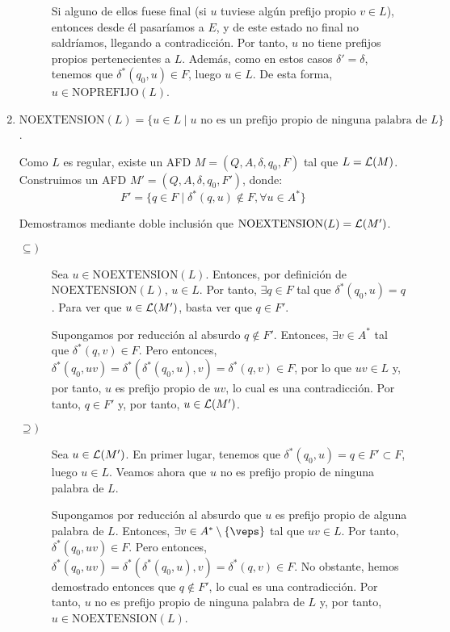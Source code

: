 \begin{ejercicio}
\begin{enumerate}
\begin{description}
            Si alguno de ellos fuese final (si $u$ tuviese algún prefijo propio $v\in L$), entonces desde él pasaríamos a $E$, y de este estado no final no saldríamos, llegando a contradicción. Por tanto, $u$ no tiene prefijos propios pertenecientes a $L$. Además, como en estos casos $\delta'=\delta$, tenemos que $\delta^{\ast}(q_0, u)\in F$, luego $u\in L$. De esta forma, $u\in \text{NOPREFIJO}(L)$.
        \end{description}
        
        \item $\text{NOEXTENSION}(L) = \{u \in L \mid u \text{ no es un prefijo propio de ninguna palabra de } L\}$.
        
        Como $L$ es regular, existe un AFD $M=(Q, A, \delta, q_0, F)$ tal que $L=\mathcal{L}(M)$. Construimos un AFD $M'=(Q, A, \delta, q_0, F')$, donde:
        \begin{equation*}
            F'=\{q\in F\mid \delta^{\ast}(q,u)\notin F,\forall u\in A^*\}
        \end{equation*}

        Demostramos mediante doble inclusión que $\text{NOEXTENSION}(L)=\mathcal{L}(M')$.
        \begin{description}
            \item[$\subseteq)$] Sea $u\in \text{NOEXTENSION}(L)$. Entonces, por definición de $\text{NOEXTENSION}(L)$, $u\in L$. Por tanto, $\exists q\in F$ tal que $\delta^{\ast}(q_0, u)=q$. Para ver que $u\in \mathcal{L}(M')$, basta ver que $q\in F'$. 
            
            Supongamos por reducción al absurdo $q\notin F'$. Entonces, $\exists v\in A^*$ tal que $\delta^{\ast}(q, v)\in F$. Pero entonces, $\delta^{\ast}(q_0, uv)=\delta^{\ast}(\delta^{\ast}(q_0, u), v)=\delta^{\ast}(q, v)\in F$, por lo que $uv\in L$ y, por tanto, $u$ es prefijo propio de $uv$, lo cual es una contradicción. Por tanto, $q\in F'$ y, por tanto, $u\in \mathcal{L}(M')$.

            \item[$\supseteq)$] Sea $u\in \mathcal{L}(M')$. En primer lugar, tenemos que $\delta^{\ast}(q_0, u)=q\in F'\subset F$, luego $u\in L$. Veamos ahora que $u$ no es prefijo propio de ninguna palabra de $L$.
            
            Supongamos por reducción al absurdo que $u$ es prefijo propio de alguna palabra de $L$. Entonces, $\exists v\in A^*\setminus \{\veps\}$ tal que $uv\in L$. Por tanto, $\delta^{\ast}(q_0, uv)\in F$. Pero entonces, $\delta^{\ast}(q_0, uv)=\delta^{\ast}(\delta^{\ast}(q_0, u), v)=\delta^{\ast}(q, v)\in F$.
            No obstante, hemos demostrado entonces que $q\notin F'$, lo cual es una contradicción. Por tanto, $u$ no es prefijo propio de ninguna palabra de $L$ y, por tanto, $u\in \text{NOEXTENSION}(L)$.
        \end{description}
    \end{enumerate}
\end{ejercicio}

